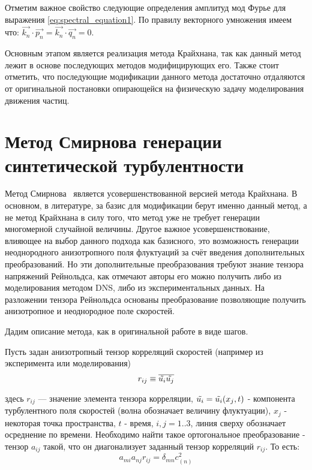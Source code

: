 Отметим важное свойство следующие определения амплитуд мод Фурье для выражения \ref{eq:spectral_equation1}. По правилу векторного умножения имеем что: $\vec{k_n} \cdot \vec{p_n} = \vec{k_n} \cdot \vec{q_n} = 0$. 

Основным этапом является реализация метода Крайхнана, так как данный метод лежит в основе последующих методов модифицирующих его. Также стоит отметить, что последующие модификации данного метода достаточно отдаляются от оригинальной постановки опирающейся на физическую задачу моделирования движения частиц.

\section{Метод Смирнова генерации синтетической турбулентности} \label{sect2_2}

Метод Смирнова~\cite{Smirnov2001} является усовершенствованной версией метода Крайхнана. В основном, в литературе, за базис для модификации берут именно данный метод, а не метод Крайхнана в силу того, что метод уже не требует генерации многомерной случайной величины. Другое важное усовершенствование, влияющее на выбор данного подхода как базисного, это возможность генерации неоднородного анизотропного поля флуктуаций за счёт введения дополнительных преобразований. Но эти дополнительные преобразования требуют знание тензора напряжений Рейнольдса, как отмечают авторы его можно получить либо из моделирования методом DNS, либо из экспериментальных данных. На разложении тензора Рейнольдса основаны преобразование позволяющие получить анизотропное и неоднородное поле скоростей. 


Дадим описание метода, как в оригинальной работе в виде шагов.

Пусть задан анизотропный тензор корреляций скоростей (например из эксперимента или моделирования)
\begin{equation}
  \label{eq:spectral_equation3}
    r_{ij} \equiv \overline{\Tilde{u_i} \Tilde{u_j}}
\end{equation}

здесь $r_{ij}$ — значение элемента тензора корреляции, $\Tilde{u_i} = \Tilde{u_i}(x_j, t)$ - компонента турбулентного поля скоростей (волна обозначает величину флуктуации), $x_j$ - некоторая точка пространства, $t$ - время, $i,j=1..3$, линия сверху обозначает осреднение по времени. 
Необходимо найти такое ортогональное преобразование - тензор $a_{ij}$ такой, что он диагонализует заданный тензор корреляций $r_{ij}$. То есть:
\begin{equation}
  \label{eq:spectral_equation4}
    a_{mi} a_{nj} r_{ij} = \delta_{mn} c^2_(n)
\end{equation}

